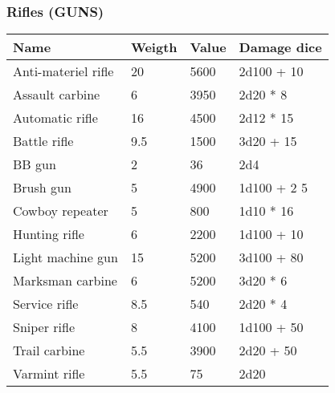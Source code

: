 
\subsubsection{Rifles (GUNS)}
\begin{longtable}{|p{4cm}|p{1.5cm}|p{1.5cm}|p{9cm}|}
\hline
\bfseries Name & \bfseries Weigth & \bfseries Value & \bfseries Damage dice \\
\hline
\endhead
Anti-materiel rifle & 20 & 5600 & 2d100 + 10 \\
Assault carbine & 6 & 3950 & 2d20 * 8 \\
Automatic rifle & 16 & 4500 & 2d12 * 15 \\
Battle rifle & 9.5 & 1500 & 3d20 + 15 \\
BB gun & 2 & 36 & 2d4 \\
Brush gun & 5 & 4900 & 1d100 + 2 5 \\
Cowboy repeater & 5 & 800 & 1d10 * 16 \\
Hunting rifle & 6 & 2200 & 1d100 + 10 \\
Light machine gun & 15 & 5200 & 3d100 + 80 \\
Marksman carbine & 6 & 5200 & 3d20 * 6 \\
Service rifle & 8.5 & 540 & 2d20 * 4 \\
Sniper rifle & 8 & 4100 & 1d100 + 50 \\
Trail carbine & 5.5 & 3900 & 2d20 + 50 \\
Varmint rifle & 5.5 & 75 & 2d20 \\
\hline
\end{longtable}

